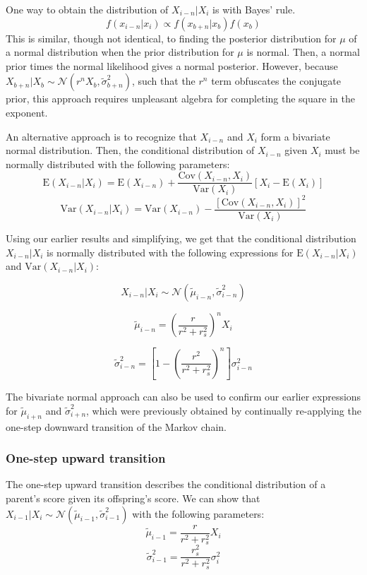 \documentclass[letterpaper,10pt]{article} %
\begin{document}
One way to obtain the distribution of $X_{i-n}|X_i$ is with Bayes' rule. 
$$f(x_{i-n}|x_i) \propto f(x_{b+n}|x_b) f(x_b)$$
This is similar, though not identical, to finding the posterior distribution for $\mu$ of a normal distribution when the prior distribution for $\mu$ is normal. Then, a normal prior times the normal likelihood gives a normal posterior. However, because $X_{b+n}|X_b \sim \mathcal{N}(r^n X_b, \tilde{\sigma}_{b+n}^2)$, such that the $r^n$ term obfuscates the conjugate prior, this approach requires unpleasant algebra for completing the square in the exponent. 

An alternative approach is to recognize that $X_{i-n}$ and $X_i$ form a bivariate normal distribution. Then, the conditional distribution of $X_{i-n}$ given $X_i$ must be normally distributed with the following parameters:
$$\mathrm{E}(X_{i-n}|X_i) = \mathrm{E}(X_{i-n}) + \frac{\mathrm{Cov}(X_{i-n}, X_i)}{\mathrm{Var}(X_i)}[X_i - \mathrm{E}(X_i)]$$
$$\mathrm{Var}(X_{i-n}|X_i) = \mathrm{Var}(X_{i-n}) - \frac{[\mathrm{Cov}(X_{i-n}, X_i)]^2}{\mathrm{Var}(X_i)}$$

Using our earlier results and simplifying, we get that the conditional distribution $X_{i-n}|X_i$ is normally distributed with the following expressions for $\mathrm{E}(X_{i-n}|X_i)$ and $\mathrm{Var}(X_{i-n}|X_i)$:

$$X_{i-n}|X_i \sim \mathcal{N}( \tilde{\mu}_{i-n}, \tilde{\sigma}_{i-n}^2)$$

$$\tilde{\mu}_{i-n} = (\frac{r}{r^2+r_s^2})^n X_i$$

$$\tilde{\sigma}_{i-n}^2 = [1 - (\frac{r^2}{r^2+r_s^2})^n] \sigma_{i-n}^2$$

The bivariate normal approach can also be used to confirm our earlier expressions for $\tilde{\mu}_{i+n}$ and $\tilde{\sigma}_{i+n}^2$, which were previously obtained by continually re-applying the one-step downward transition of the Markov chain.

\subsubsection*{One-step upward transition}
The one-step upward transition describes the conditional distribution of a parent's score given its offspring's score. We can show that $X_{i-1}|X_i \sim \mathcal{N}( \tilde{\mu}_{i-1}, \tilde{\sigma}_{i-1}^2)$ with the following parameters:
$$\tilde{\mu}_{i-1} = \frac{r}{r^2+r_s^2} X_i$$
$$\tilde{\sigma}_{i-1}^2 = \frac{r_s^2}{r^2+r_s^2} \sigma_i^2$$
\end{document}
